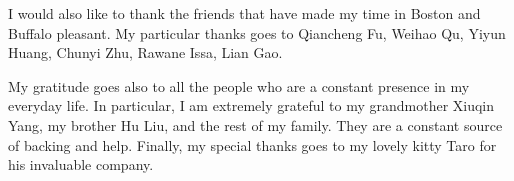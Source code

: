 I would also like to thank the friends that have made my time in Boston and Buffalo pleasant. My particular thanks goes to Qiancheng Fu, Weihao Qu, Yiyun Huang, Chunyi Zhu, Rawane Issa, Lian Gao.



My gratitude goes also to all the people who are a constant presence in my everyday life. In particular, I am extremely grateful to my grandmother Xiuqin Yang, my brother Hu Liu, and the rest of my family. They are a constant source of backing and help. Finally, my special thanks goes to my lovely kitty Taro for his invaluable company.





